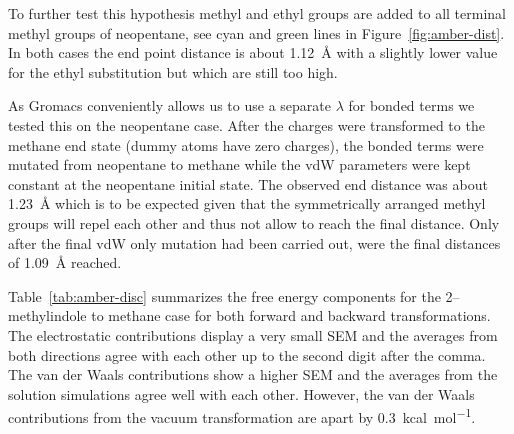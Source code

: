 \documentclass[journal=jctcce,manuscript=suppinfo]{achemso}
\begin{document}
To further test this hypothesis methyl and ethyl groups are added to
all terminal methyl groups of neopentane, see cyan and green lines in
Figure~\ref{fig:amber-dist}.  In both cases the end point distance is
about \SI{1.12}{\angstrom} with a slightly lower value for the ethyl
substitution but which are still too high.

As Gromacs conveniently allows us to use a separate $\lambda$ for bonded
terms we tested this on the neopentane case.  After the charges were
transformed to the methane end state (dummy atoms have zero charges),
the bonded terms were mutated from neopentane to methane while the vdW
parameters were kept constant at the neopentane initial state.  The
observed end distance was about \SI{1.23}{\angstrom} which is to be
expected given that the symmetrically arranged methyl groups
will repel each other and thus not allow to reach the final distance.
Only after the final vdW only mutation had been carried out, were the final distances of \SI{1.09}{\angstrom} reached.

Table~\ref{tab:amber-disc} summarizes the free energy components for the 2--methylindole to methane case for both forward and backward transformations.  The electrostatic contributions display a very small SEM and the averages from both directions agree with each other up to the second digit after the comma.  The van der Waals contributions show a higher SEM and the averages from the solution simulations agree well with each other.  However, the van der Waals contributions from the vacuum transformation are apart by \SI{0.3}{kcal.mol^{-1}}.
\begin{table}
  \begin{minipage}{\linewidth}
    \caption{Free energy components for 2--methylindole computed from implicit dummy RAFE simulations.  The data are averages over three runs.}\label{tab:amber-disc}
  \end{minipage}
\end{table}
\end{document}
